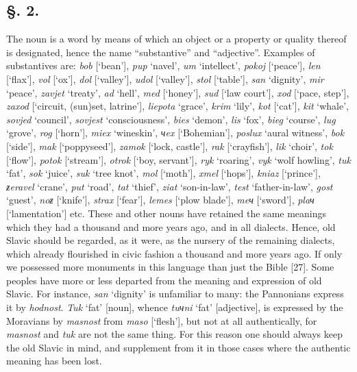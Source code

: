 \subsection*{\hspace*{\fill}§. 2.\hspace*{\fill}}

The noun is a word by means of which an object or a property or quality thereof is designated, hence the name “substantive” and “adjective”. Examples of substantives are: \textit{bob} [‘bean’], \textit{pup} ‘navel’, \textit{um} ‘intellect’, \textit{pokoj} [‘peace’], \textit{len} [‘flax’], \textit{vol} [‘ox’], \textit{dol} [‘valley’], \textit{udol} [‘valley’], \textit{stol} [‘table’], \textit{san} ‘dignity’, \textit{mir} ‘peace’, \textit{zavjet} ‘treaty’, \textit{ad} ‘hell’, \textit{med} [‘honey’], \textit{sud} [‘law court’], \textit{xod} [‘pace, step’], \textit{zaxod} [‘circuit, (sun)set, latrine’], \textit{liepota} ‘grace’, \textit{krim} ‘lily’, \textit{kot} [‘cat’], \textit{kit} ‘whale’, \textit{sovjed} ‘council’, \textit{sovjest} ‘consciousness’, \textit{bies} ‘demon’, \textit{lis} ‘fox’, \textit{bieg} ‘course’, \textit{lug} ‘grove’, \textit{rog} [‘horn’], \textit{miex} ‘wineskin’, \textit{чex} [‘Bohemian’], \textit{poslux} ‘aural witness’, \textit{bok} [‘side’], \textit{mak} [‘poppyseed’], \textit{zamok} [‘lock, castle’], \textit{rak} [‘crayfish’], \textit{lik} ‘choir’, \textit{tok} [‘flow’], \textit{potok} [‘stream’], \textit{otrok} [‘boy, servant’], \textit{ryk} ‘roaring’, \textit{vyk} ‘wolf howling’, \textit{tuk} ‘fat’, \textit{sok} ‘juice’, \textit{suk} ‘tree knot’, \textit{mol} [‘moth’], \textit{xmel} [‘hops’], \textit{kniaz} \linebreak{}[‘prince’], \textit{ƶeravel} ‘crane’, \textit{put} ‘road’, \textit{tat} ‘thief’, \textit{ziat} ‘son-in-law’, \textit{test} ‘father-in-law’, \textit{gost} ‘guest’, \textit{noƶ} [‘knife’], \textit{strax} [‘fear’], \textit{lemes} [‘plow blade’], \textit{meч} [‘sword’], \textit{plaч} [‘lamentation’] etc. These and other nouns have retained the same meanings which they had a thousand and more years ago, and in all dialects. Hence, old Slavic should be regarded, as it were, as the nursery of the remaining dialects, which already flourished in civic fashion a thousand and more years ago. If only we possessed more monuments in this language than just the Bible [27]. Some peoples have more or less departed from the meaning and expression of old Slavic. For instance, \textit{san} ‘dignity’ is unfamiliar to many: the Pannonians express it by \textit{hodnost}. \textit{Tuk} ‘fat’ [noun], whence \textit{tuчni} ‘fat’ [adjective], is expressed by the Moravians by \textit{masnost} from \textit{maso} [‘flesh’], but not at all authentically, for \textit{masnost} and \textit{tuk} are not the same thing. For this reason one should always keep the old Slavic in mind, and supplement from it in those cases where the authentic meaning has been lost.

